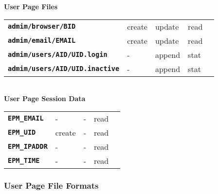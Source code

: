\documentclass[12pt]{article}
\newcommand{\TT}[1]{{\tt \bfseries #1}}
\begin{document}
\begin{center}
{\bf User Page Files}
\\[1ex]
\begin{tabular}{lllll}
\TT{admim/browser/BID}	& create  & update & read \\
\TT{admim/email/EMAIL}	& create  & update & read \\
\TT{admim/users/AID/UID.login}
			& -       & append & stat \\
\TT{admim/users/AID/UID.inactive}
			& -       & append & stat \\
\end{tabular}
\\[3ex]
{\bf User Page Session Data}
\\[1ex]
\begin{tabular}{lllll}
\TT{EPM\_EMAIL}	& -       & -      & read \\
\TT{EPM\_UID}	& create  & -      & read \\
\TT{EPM\_IPADDR}& -       & -      & read \\
\TT{EPM\_TIME}
                & -       & -      & read \\
\end{tabular}
\end{center}

\subsubsection{User Page File Formats}
\end{document}
